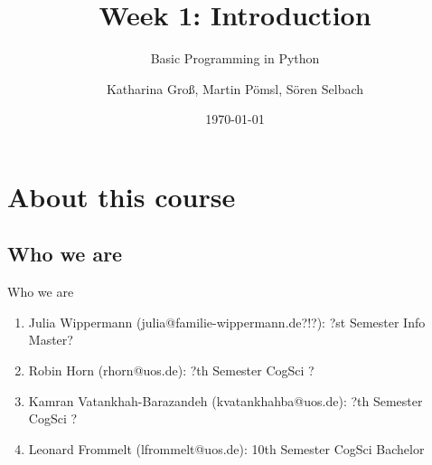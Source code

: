 
\usepackage{gensymb}

\makeatletter
{}
\tw@make@key@macro*{\OS}
\makeatother





\title[Introduction]{Week 1: Introduction}
\subtitle{Basic Programming in Python}

\author[kgross, mpoemsl, sselbach]{Katharina Groß, Martin Pömsl, Sören Selbach}

\date{\today}

\begin{frame}[plain]
    \titlepage
\end{frame}

\begin{frame}
    \tableofcontents
\end{frame}

\section{About this course}
\subsection{Who we are}

\begin{frame}{Who we are}

    \begin{enumerate}
        \item Julia Wippermann (julia@familie-wippermann.de?!?):
        \newline ?st Semester Info Master?
        \newline
        \item Robin Horn (rhorn@uos.de):
        \newline ?th Semester CogSci ?
        \item Kamran Vatankhah-Barazandeh (kvatankhahba@uos.de):
        \newline ?th Semester CogSci ?
        \newline
        \item Leonard Frommelt (lfrommelt@uos.de):
        \newline 10th Semester CogSci Bachelor
    \end{enumerate}

\end{frame}

